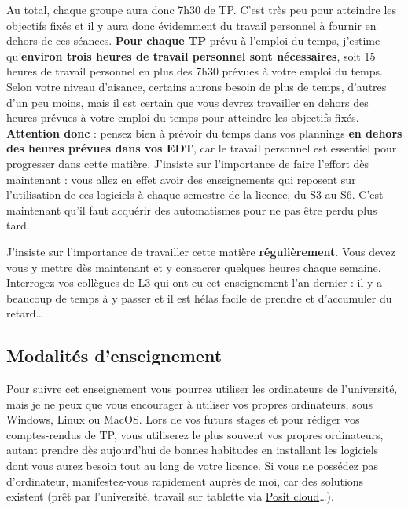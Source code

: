 \documentclass[
  a4paper,
  DIV=11,
  numbers=noendperiod,
  oneside]{scrreprt}
\begin{document}
Au total, chaque groupe aura donc 7h30 de TP. C'est très peu pour
atteindre les objectifs fixés et il y aura donc évidemment du travail
personnel à fournir en dehors de ces séances. \textbf{Pour chaque TP}
prévu à l'emploi du temps, j'estime qu'\textbf{environ trois heures de
travail personnel sont nécessaires}, soit 15 heures de travail personnel
en plus des 7h30 prévues à votre emploi du temps. Selon votre niveau
d'aisance, certains aurons besoin de plus de temps, d'autres d'un peu
moins, mais il est certain que vous devrez travailler en dehors des
heures prévues à votre emploi du temps pour atteindre les objectifs
fixés. \textbf{Attention donc} : pensez bien à prévoir du temps dans vos
plannings \textbf{en dehors des heures prévues dans vos EDT}, car le
travail personnel est essentiel pour progresser dans cette matière.
J'insiste sur l'importance de faire l'effort dès maintenant : vous allez
en effet avoir des enseignements qui reposent sur l'utilisation de ces
logiciels à chaque semestre de la licence, du S3 au S6. C'est maintenant
qu'il faut acquérir des automatismes pour ne pas être perdu plus tard.

\begin{tcolorbox}[enhanced jigsaw, coltitle=black, toprule=.15mm, opacityback=0, breakable, colback=white, opacitybacktitle=0.6, colframe=quarto-callout-warning-color-frame, leftrule=.75mm, rightrule=.15mm, titlerule=0mm, bottomtitle=1mm, toptitle=1mm, arc=.35mm, title=\textcolor{quarto-callout-warning-color}{\faExclamationTriangle}\hspace{0.5em}{Travaillez régulièrement !}, colbacktitle=quarto-callout-warning-color!10!white, bottomrule=.15mm, left=2mm]

J'insiste sur l'importance de travailler cette matière
\textbf{régulièrement}. Vous devez vous y mettre dès maintenant et y
consacrer quelques heures chaque semaine. Interrogez vos collègues de L3
qui ont eu cet enseignement l'an dernier : il y a beaucoup de temps à y
passer et il est hélas facile de prendre et d'accumuler du
retard\ldots{}

\end{tcolorbox}

\subsection*{Modalités d'enseignement}\label{modalituxe9s-denseignement}

Pour suivre cet enseignement vous pourrez utiliser les ordinateurs de
l'université, mais je ne peux que vous encourager à utiliser vos propres
ordinateurs, sous Windows, Linux ou MacOS. Lors de vos futurs stages et
pour rédiger vos comptes-rendus de TP, vous utiliserez le plus souvent
vos propres ordinateurs, autant prendre dès aujourd'hui de bonnes
habitudes en installant les logiciels dont vous aurez besoin tout au
long de votre licence. Si vous ne possédez pas d'ordinateur,
manifestez-vous rapidement auprès de moi, car des solutions existent
(prêt par l'université, travail sur tablette via
\href{https://posit.cloud}{Posit cloud}\ldots).
\end{document}
